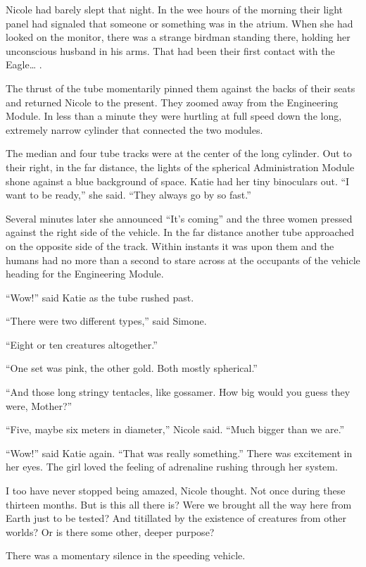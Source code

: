 \documentclass[]{article}
\begin{document}
{Nicole had barely slept that night. In the wee hours of the morning their light panel had signaled that someone or something was in the atrium. When she had looked on the monitor, there was a strange birdman standing there, holding her unconscious husband in his arms. That had been their first contact with the Eagle… .

The thrust of the tube momentarily pinned them against the backs of their seats and returned Nicole to the present. They zoomed away from the Engineering Module. In less than a minute they were hurtling at full speed down the long, extremely narrow cylinder that connected the two modules.

The median and four tube tracks were at the center of the long cylinder. Out to their right, in the far distance, the lights of the spherical Administration Module shone against a blue background of space. Katie had her tiny binoculars out. “I want to be ready,” she said. “They always go by so fast.”

Several minutes later she announced “It’s coming” and the three women pressed against the right side of the vehicle. In the far distance another tube approached on the opposite side of the track. Within instants it was upon them and the humans had no more than a second to stare across at the occupants of the vehicle heading for the Engineering Module.

“Wow!” said Katie as the tube rushed past.

“There were two different types,” said Simone.

“Eight or ten creatures altogether.”

“One set was pink, the other gold. Both mostly spherical.”

“And those long stringy tentacles, like gossamer. How big would you guess they were, Mother?”

“Five, maybe six meters in diameter,” Nicole said. “Much bigger than we are.”

“Wow!” said Katie again. “That was really something.” There was excitement in her eyes. The girl loved the feeling of adrenaline rushing through her system.

I too have never stopped being amazed, Nicole thought. Not once during these thirteen months. But is this all there is? Were we brought all the way here from Earth just to be tested? And titillated by the existence of creatures from other worlds? Or is there some other, deeper purpose?

There was a momentary silence in the speeding vehicle.

}
\end{document}
